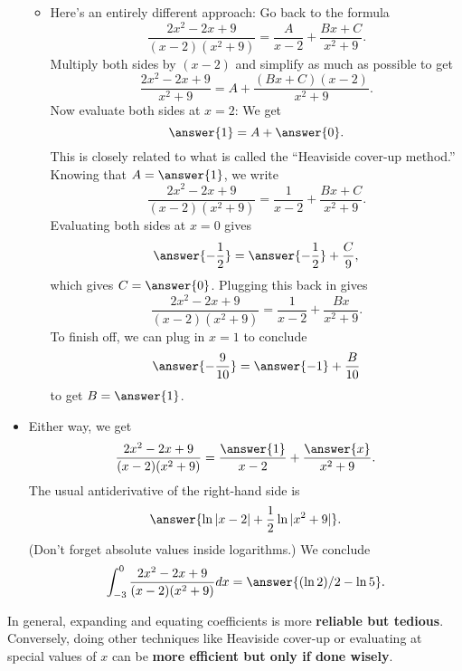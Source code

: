 \documentclass{ximera}
\begin{document}
\begin{example}
\begin{itemize}
\begin{itemize}
\item Here's an entirely different approach: Go back to the formula
\[\frac{2 x^2 - 2x + 9}{(x-2)(x^2+9)} = \frac{A}{x-2} + \frac{Bx + C}{x^2+9}. \]
Multiply both sides by $(x-2)$ and simplify as much as possible to get
\[ \frac{2 x^2 - 2x + 9}{x^2+9} = A + \frac{(Bx + C)(x-2)}{x^2+9}. \]
Now evaluate both sides at $x = 2$: We get
\[ \answer{1} = A + \answer{0}. \]
This is closely related to what is called the ``Heaviside cover-up method.''
Knowing that $A = \answer{1}$, we write
\[\frac{2 x^2 - 2x + 9}{(x-2)(x^2+9)} = \frac{1}{x-2} + \frac{Bx + C}{x^2+9}. \]
Evaluating both sides at $x = 0$ gives
\[ \answer{-\frac{1}{2}} = \answer{- \frac{1}{2}} + \frac{C}{9}, \]
which gives $C = \answer{0}$. Plugging this back in gives
\[\frac{2 x^2 - 2x + 9}{(x-2)(x^2+9)} = \frac{1}{x-2} + \frac{Bx}{x^2+9}. \]
To finish off, we can plug in $x = 1$ to conclude
\[ \answer{-\frac{9}{10}} = \answer{-1} + \frac{B}{10} \]
to get $B = \answer{1}$.
\end{itemize}
\item Either way, we get
\[ \frac{2x^2 - 2x + 9}{(x-2)(x^2+9)} = \frac{\answer{1}}{x-2} + \frac{\answer{x}}{x^2+9}. \]
The usual antiderivative of the right-hand side is
\[  \answer{\ln |x-2| + \frac{1}{2} \ln |x^2+9|}. \]
(Don't forget absolute values inside logarithms.)
We conclude
\[ \int_{-3}^0 \frac{2 x^2 - 2x + 9}{(x-2)(x^2+9)} dx = \answer{(\ln 2)/2 - \ln 5} . \]
\end{itemize}
\end{example}

In general, expanding and equating coefficients is more \textbf{reliable but tedious}. Conversely, doing other techniques like Heaviside cover-up or evaluating at special values of $x$ can be \textbf{more efficient but only if done wisely}.
\end{document}
